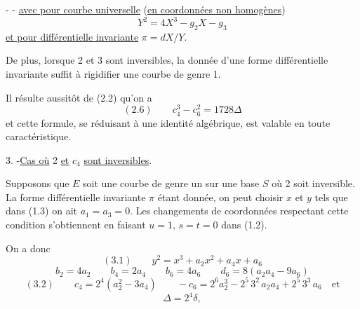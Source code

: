 -  -
\uline{avec pour courbe universelle} (\uline{en coordonnées non homogènes}) \inserted{\unsure{$\rho$}}
\[
Y^2=4X^3-g_2X-g_3
\]
\uline{et pour différentielle invariante} $\pi=dX/Y$.

De plus, lorsque 2 et 3 sont inversibles, la donnée d'une forme différentielle invariante suffit à rigidifier une courbe de genre 1.

Il résulte aussitôt de (2.2) qu'on a
\[
(2.6)\qquad c_4^3-c_6^2=1728\Delta
\]
et cette formule, se réduisant à une identité algébrique, est valable en toute caractéristique.

3. -\quad \uline{Cas où} 2 \uline{et} $c_4$ \uline{sont inversibles}.

Supposons que $E$ soit une courbe de genre un sur une base $S$ où 2 soit inversible. La forme différentielle invariante $\pi$ étant donnée, on peut choisir $x$ et $y$ tels que dans (1.3) on ait $a_1=a_3=0$. Les changements de coordonnées respectant cette condition s'obtiennent en faisant $u=1$, $s=t=0$ dans (1.2).

On a donc
\[
(3.1)\qquad y^2=x^3+a_2x^2+a_4x+a_6
\]
\[
b_2=4a_2\qquad b_4=2a_4\qquad b_6=4a_6\qquad d_6=8(a_2a_4-9a_6)
\]
\[
(3.2)\qquad c_4=2^4(a_2^2-3a_4)\qquad -c_6=2^6a_2^3-2^5\,3^2\,a_2a_4+2^5\,3^3\,a_6\quad\text{et}
\]
\[
\Delta=2^4\delta,
\]
